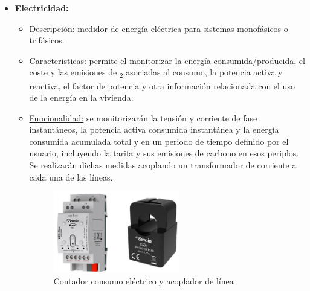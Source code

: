 \begin{itemize}
\item \textbf{Electricidad:} 
	\begin{itemize}
	\item\underline{Descripción:} medidor de energía eléctrica para sistemas monofásicos o trifásicos.
	\item \underline{Características:} permite el monitorizar la energía consumida/producida, el coste y las emisiones de \textsubscript{2} asociadas al consumo, la potencia activa y reactiva, el factor de potencia y otra información relacionada con el uso de la energía en la vivienda.
	\item \underline{Funcionalidad:} se monitorizarán la tensión y corriente de fase instantáneos, la potencia activa consumida instantánea y la energía consumida acumulada total y en un periodo de tiempo definido por el usuario, incluyendo la tarifa y sus emisiones de carbono en esos periplos. Se realizarán dichas medidas acoplando un transformador de corriente a cada una de las líneas. 
	\begin{figure}[H]
	\centering
	\includegraphics[width=0.55\textwidth]{figures/contador_electricidad.png}   
	\caption{Contador consumo eléctrico y acoplador de línea }
	\label{fig:contador_electricidad}
	\end{figure}
	\end{itemize} 


\end{itemize}
